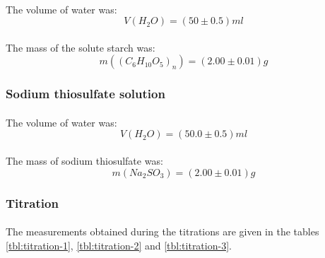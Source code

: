 \documentclass[a4paper]{article}
\begin{document}
\paragraph*{}
The volume of water was:
$$V(H_2O) = (50 \pm 0.5) \si{ml}$$

\paragraph*{}
The mass of the solute starch was:
$$m\left( \left( C_6 H_{10} O_5 \right)_n \right) = (2.00 \pm 0.01) \si{g}$$

\subsubsection{Sodium thiosulfate solution}

\paragraph*{}
The volume of water was:
$$V(H_2O) = (50.0 \pm 0.5) \si{ml}$$

\paragraph*{}
The mass of sodium thiosulfate was:
$$m(Na_2SO_3) = (2.00 \pm 0.01) \si{g}$$

\subsubsection{Titration}

\paragraph*{}
The measurements obtained during the titrations are given in the tables
\ref{tbl:titration-1}, \ref{tbl:titration-2} and \ref{tbl:titration-3}.
\end{document}
